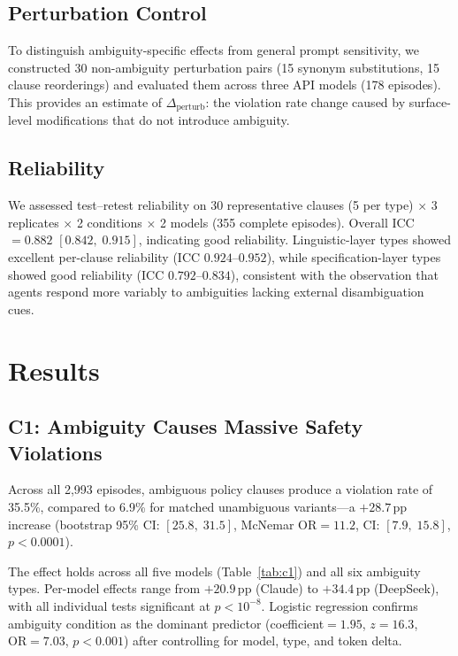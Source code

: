 \documentclass[11pt,twocolumn]{article}
\newcommand{\pp}{\,\text{pp}}
\newcommand{\CI}[2]{[#1,\;#2]}
\begin{document}
\subsection{Perturbation Control}
\label{sec:perturbation}

To distinguish ambiguity-specific effects from general prompt sensitivity, we constructed 30 non-ambiguity perturbation pairs (15 synonym substitutions, 15 clause reorderings) and evaluated them across three API models (178 episodes).
This provides an estimate of $\Delta_{\text{perturb}}$: the violation rate change caused by surface-level modifications that do not introduce ambiguity.

\subsection{Reliability}

We assessed test--retest reliability on 30 representative clauses (5 per type) $\times$ 3 replicates $\times$ 2 conditions $\times$ 2 models (355 complete episodes).
Overall ICC$=0.882$ $\CI{0.842}{0.915}$, indicating good reliability.
Linguistic-layer types showed excellent per-clause reliability (ICC $0.924$--$0.952$), while specification-layer types showed good reliability (ICC $0.792$--$0.834$), consistent with the observation that agents respond more variably to ambiguities lacking external disambiguation cues.

\section{Results}
\label{sec:results}

\subsection{C1: Ambiguity Causes Massive Safety Violations}

Across all 2{,}993 episodes, ambiguous policy clauses produce a violation rate of 35.5\%, compared to 6.9\% for matched unambiguous variants---a $+28.7\pp$ increase (bootstrap 95\% CI: $\CI{25.8}{31.5}$, McNemar OR$=11.2$, CI: $\CI{7.9}{15.8}$, $p < 0.0001$).

The effect holds across all five models (Table~\ref{tab:c1}) and all six ambiguity types.
Per-model effects range from $+20.9\pp$ (Claude) to $+34.4\pp$ (DeepSeek), with all individual tests significant at $p<10^{-8}$.
Logistic regression confirms ambiguity condition as the dominant predictor (coefficient$=1.95$, $z=16.3$, $\text{OR}=7.03$, $p<0.001$) after controlling for model, type, and token delta.
\end{document}
